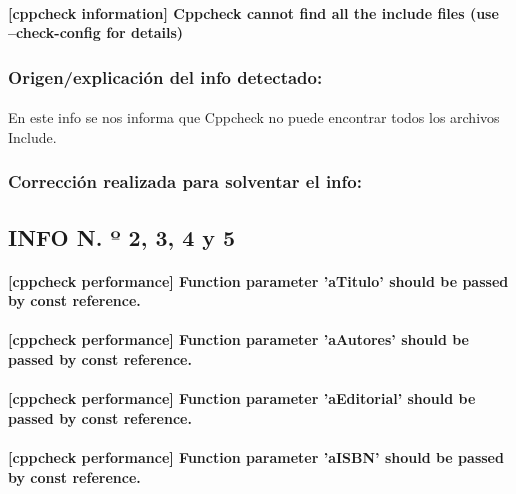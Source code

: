 		\paragraph{[cppcheck information] Cppcheck cannot find all the include files (use --check-config for details)}
	
		\subsubsection{Origen/explicación del info detectado:}
		
			\paragraph{}En este info se nos informa que Cppcheck no puede encontrar todos los archivos Include.
			
		\subsubsection{Corrección realizada para solventar el info:}
		
	\subsection{INFO N. º 2, 3, 4 y 5 }
	
		\paragraph{[cppcheck performance] Function parameter 'aTitulo' should be passed by const reference.}
		
		\paragraph{[cppcheck performance] Function parameter 'aAutores' should be passed by const reference.	}
		
		\paragraph{[cppcheck performance] Function parameter 'aEditorial' should be passed by const reference.}
		
		\paragraph{[cppcheck performance] Function parameter 'aISBN' should be passed by const reference.}
	
